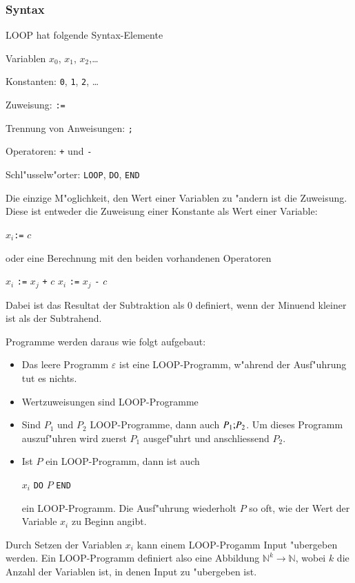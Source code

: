 \subsubsection{Syntax}
LOOP hat folgende Syntax-Elemente
\begin{compactitem}
\item Variablen $x_0$, $x_1$, $x_2$,\dots
\item Konstanten: {\tt 0}, {\tt 1}, {\tt 2}, \dots
\item Zuweisung: {\tt :=}
\item Trennung von Anweisungen: {\tt ;}
\item Operatoren: {\tt +} und {\tt -}
\item Schl"usselw"orter: {\tt LOOP}, {\tt DO}, {\tt END}
\end{compactitem}
Die einzige M"oglichkeit, den Wert einer Variablen zu "andern ist die
Zuweisung.  Diese ist entweder die Zuweisung einer Konstante als
Wert einer Variable:
\begin{algorithmic}
\STATE $x_i${\tt :=} $c$
\end{algorithmic}
oder eine Berechnung mit den beiden vorhandenen Operatoren
\begin{algorithmic}
\STATE $x_i$ {\tt :=} $x_j$ {\tt +} $c$
\STATE $x_i$ {\tt :=} $x_j$ {\tt -} $c$
\end{algorithmic}
Dabei ist das Resultat der Subtraktion als $0$ definiert, wenn 
der Minuend kleiner ist als der Subtrahend.

Programme werden daraus wie folgt aufgebaut:
\begin{itemize}
\item Das leere Programm $\varepsilon$ ist eine LOOP-Programm,
w"ahrend der Ausf"uhrung tut es nichts.
\item Wertzuweisungen sind LOOP-Programme
\item Sind $P_1$ und $P_2$ LOOP-Programme, dann auch 
$P_1{\tt ;}P_2$. Um dieses Programm auszuf"uhren wird zuerst $P_1$ 
ausgef"uhrt und anschliessend $P_2$.
\item Ist $P$ ein LOOP-Programm, dann ist auch
\begin{algorithmic}
 $x_i$ {\tt DO} $P$ {\tt END}
\end{algorithmic}
ein LOOP-Programm. Die Ausf"uhrung wiederholt $P$ so oft, wie der
Wert der Variable $x_i$  zu Beginn angibt.
\end{itemize}
Durch Setzen der Variablen $x_i$ kann einem LOOP-Progamm Input "ubergeben
werden.
Ein LOOP-Programm definiert also eine Abbildung $\mathbb N^k\to\mathbb N$,
wobei $k$ die Anzahl der Variablen ist, in denen Input zu "ubergeben ist.

